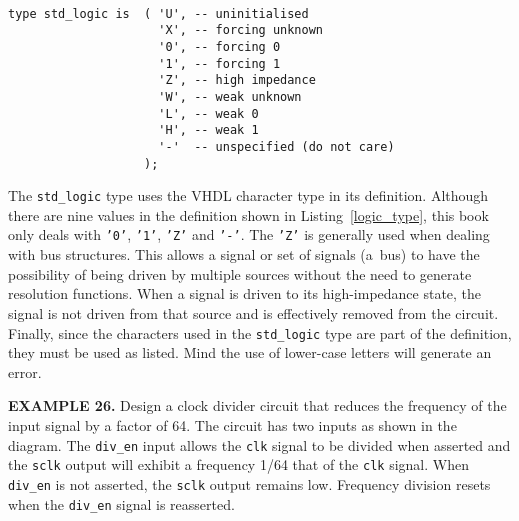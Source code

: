 \noindent
\begin{minipage}{0.99\linewidth}
\begin{lstlisting}[label=logic_type, caption=Declaration of the \texttt{std\_logic} enumerated type.]

type std_logic is  ( 'U', -- uninitialised
                     'X', -- forcing unknown
                     '0', -- forcing 0
                     '1', -- forcing 1
                     'Z', -- high impedance
                     'W', -- weak unknown
                     'L', -- weak 0
                     'H', -- weak 1
                     '-'  -- unspecified (do not care)
                   );
\end{lstlisting}
\end{minipage}

The \texttt{std\_logic} type uses the VHDL character type in its definition. Although there are nine values in the definition shown in Listing~\ref{logic_type}, this book only deals with \texttt{'0'},  \texttt{'1'},  \texttt{'Z'} and  \texttt{'-'}. The  \texttt{'Z'} is generally used when dealing with bus structures. This allows a signal or set of signals (a~bus) to have the possibility of being driven by multiple sources without the need to generate resolution functions. When a signal is driven to its high-impedance state, the signal is not driven from that source and is effectively removed from the circuit. Finally, since the characters used in the \texttt{std\_logic} type are part of the definition, they must be used as listed. Mind the use of lower-case letters will generate an error.
\begin{leftbar}
\begin{minipage}[t]{0.52\textwidth}
\vspace{10pt}
\noindent
\textbf{EXAMPLE 26.}
\label{example_26}
Design a clock divider circuit that reduces the frequency of the input signal by a factor of 64. The circuit has two inputs as shown in the diagram. The  \texttt{div\_en} input allows the  \texttt{clk} signal to be divided when asserted and the  \texttt{sclk} output will exhibit a frequency 1/64 that of the  \texttt{clk} signal. When  \texttt{div\_en} is not asserted, the  \texttt{sclk} output remains low. Frequency division resets when the  \texttt{div\_en} signal is reasserted.
\end{minipage}
\begin{minipage}[t]{0.4\linewidth}
\vspace{10pt}
\begin{flushright}
\end{flushright}
\end{minipage}
\end{leftbar}
